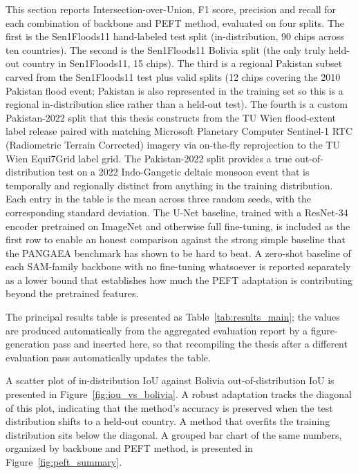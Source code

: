 \documentclass[11pt,a4paper,oneside]{report}
\newcommand{\maxwidthtable}[1]{%
  \resizebox{\ifdim\width>\linewidth \linewidth\else \width\fi}{!}{#1}%
}
\begin{document}
This section reports Intersection-over-Union, F1 score, precision and recall for each combination of backbone and PEFT method, evaluated on four splits. The first is the Sen1Floods11 hand-labeled test split (in-distribution, 90 chips across ten countries). The second is the Sen1Floods11 Bolivia split (the only truly held-out country in Sen1Floods11, 15 chips). The third is a regional Pakistan subset carved from the Sen1Floods11 test plus valid splits (12 chips covering the 2010 Pakistan flood event; Pakistan is also represented in the training set so this is a regional in-distribution slice rather than a held-out test). The fourth is a custom Pakistan-2022 split that this thesis constructs from the TU Wien flood-extent label release \cite{Roth2023Pakistan} paired with matching Microsoft Planetary Computer Sentinel-1 RTC (Radiometric Terrain Corrected) imagery via on-the-fly reprojection to the TU Wien Equi7Grid label grid. The Pakistan-2022 split provides a true out-of-distribution test on a 2022 Indo-Gangetic deltaic monsoon event that is temporally and regionally distinct from anything in the training distribution. Each entry in the table is the mean across three random seeds, with the corresponding standard deviation. The U-Net baseline, trained with a ResNet-34 encoder pretrained on ImageNet and otherwise full fine-tuning, is included as the first row to enable an honest comparison against the strong simple baseline that the PANGAEA benchmark has shown to be hard to beat. A zero-shot baseline of each SAM-family backbone with no fine-tuning whatsoever is reported separately as a lower bound that establishes how much the PEFT adaptation is contributing beyond the pretrained features.

The principal results table is presented as Table~\ref{tab:results_main}; the values are produced automatically from the aggregated evaluation report by a figure-generation pass and inserted here, so that recompiling the thesis after a different evaluation pass automatically updates the table.

\begin{table}[H]
\centering
\caption{Principal results: in-distribution and out-of-distribution IoU for every backbone-method combination, averaged across three random seeds.}
\label{tab:results_main}
\maxwidthtable{%
%
}
\end{table}

A scatter plot of in-distribution IoU against Bolivia out-of-distribution IoU is presented in Figure~\ref{fig:iou_vs_bolivia}. A robust adaptation tracks the diagonal of this plot, indicating that the method's accuracy is preserved when the test distribution shifts to a held-out country. A method that overfits the training distribution sits below the diagonal. A grouped bar chart of the same numbers, organized by backbone and PEFT method, is presented in Figure~\ref{fig:peft_summary}.
\end{document}
